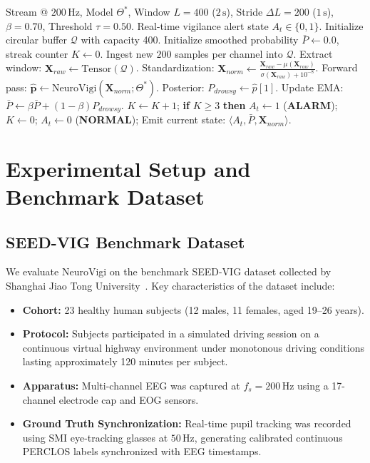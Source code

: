 \documentclass[conference]{IEEEtran}
\begin{document}
\begin{algorithm}[t]
\caption{Real-Time Streaming Vigilance Inference}
\label{alg:infer_pipe}
\begin{algorithmic}[1]
\Require Stream @ $200\,\text{Hz}$, Model $\Theta^*$, Window $L=400$ ($2\,\text{s}$), Stride $\Delta L = 200$ ($1\,\text{s}$), $\beta=0.70$, Threshold $\tau=0.50$.
\Ensure Real-time vigilance alert state $A_t \in \{0, 1\}$.
\State Initialize circular buffer $\mathcal{Q}$ with capacity 400.
\State Initialize smoothed probability $\bar{P} \gets 0.0$, streak counter $K \gets 0$.
\Loop
  \State Ingest new $200$ samples per channel into $\mathcal{Q}$.
    \State Extract window: $\mathbf{X}_{raw} \gets \text{Tensor}(\mathcal{Q})$.
    \State Standardization: $\mathbf{X}_{norm} \gets \frac{\mathbf{X}_{raw} - \mu(\mathbf{X}_{raw})}{\sigma(\mathbf{X}_{raw}) + 10^{-8}}$.
    \State Forward pass: $\hat{\mathbf{p}} \gets \text{NeuroVigi}(\mathbf{X}_{norm}; \Theta^*)$.
    \State Posterior: $P_{drowsy} \gets \hat{p}[1]$.
    \State Update EMA: $\bar{P} \gets \beta \bar{P} + (1 - \beta) P_{drowsy}$.
      \State $K \gets K + 1$;
      \State \textbf{if} $K \ge 3$ \textbf{then} $A_t \gets 1$ (\textbf{ALARM});
    \Else
      \State $K \gets 0$; $A_t \gets 0$ (\textbf{NORMAL});
    \EndIf
    \State Emit current state: $\langle A_t, \bar{P}, \mathbf{X}_{norm} \rangle$.
  \EndIf
\EndLoop
\end{algorithmic}
\end{algorithm}

\section{Experimental Setup and Benchmark Dataset}
\label{sec:setup}

\subsection{SEED-VIG Benchmark Dataset}
We evaluate NeuroVigi on the benchmark SEED-VIG dataset collected by Shanghai Jiao Tong University~\cite{zheng2017seedvig}. Key characteristics of the dataset include:
\begin{itemize}[leftmargin=*]
    \item \textbf{Cohort:} 23 healthy human subjects (12 males, 11 females, aged 19--26 years).
    \item \textbf{Protocol:} Subjects participated in a simulated driving session on a continuous virtual highway environment under monotonous driving conditions lasting approximately 120 minutes per subject.
    \item \textbf{Apparatus:} Multi-channel EEG was captured at $f_s = 200\,\text{Hz}$ using a 17-channel electrode cap and EOG sensors.
    \item \textbf{Ground Truth Synchronization:} Real-time pupil tracking was recorded using SMI eye-tracking glasses at $50\,\text{Hz}$, generating calibrated continuous PERCLOS labels synchronized with EEG timestamps.
\end{itemize}
\end{document}
